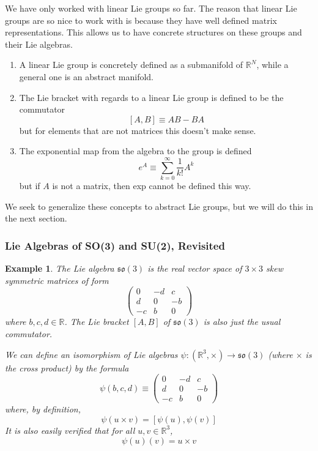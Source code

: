\documentclass{article}
\newtheorem{example}{Example}[section]
\theoremstyle{remark}
\theoremstyle{definition}
\begin{document}
We have only worked with linear Lie groups so far. The reason that linear Lie groups are so nice to work with is because they have well defined matrix representations. This allows us to have concrete structures on these groups and their Lie algebras. 
\begin{enumerate}
    \item A linear Lie group is concretely defined as a submanifold of $\mathbb{R}^N$, while a general one is an abstract manifold. 
    \item The Lie bracket with regards to a linear Lie group is defined to be the commutator 
    \[[A,B] \equiv A B - B A\]
    but for elements that are not matrices this doesn't make sense. 
    \item The exponential map from the algebra to the group is defined
    \[e^A \equiv \sum_{k=0}^\infty \frac{1}{k!} A^k\]
    but if $A$ is not a matrix, then exp cannot be defined this way.
\end{enumerate}
We seek to generalize these concepts to abstract Lie groups, but we will do this in the next section. 

\subsubsection{Lie Algebras of SO(3) and SU(2), Revisited}
\begin{example}
The Lie algebra $\mathfrak{so}(3)$ is the real vector space of $3 \times 3$ skew symmetric matrices of form 
\[\begin{pmatrix}
0 & -d & c \\ d & 0 & -b \\ -c & b & 0
\end{pmatrix}\]
where $b, c, d \in \mathbb{R}$. The Lie bracket $[A,B]$ of $\mathfrak{so}(3)$ is also just the usual commutator. 

We can define an isomorphism of Lie algebras $\psi: (\mathbb{R}^3, \times) \longrightarrow \mathfrak{so}(3)$ (where $\times$ is the cross product) by the formula 
\[\psi(b, c, d) \equiv \begin{pmatrix}
0 & -d & c \\
d & 0 & -b \\
-c & b & 0
\end{pmatrix}\]
where, by definition, 
\[\psi(u \times v) = [\psi(u), \psi(v)]\]
It is also easily verified that for all $u, v \in \mathbb{R}^3$, 
\[\psi(u) (v) = u \times v\]
\end{example}
\end{document}
